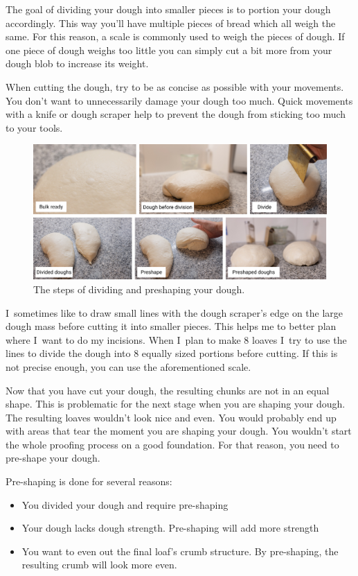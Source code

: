 The goal of dividing your dough into smaller pieces is to portion
your dough accordingly. This way you'll have multiple pieces of bread
which all weigh the same. For this reason, a scale is commonly
used to weigh the pieces of dough. If one piece of dough weighs
too little you can simply cut a bit more from your dough blob
to increase its weight.

When cutting the dough, try to be as concise as possible with your
movements. You don't want to unnecessarily damage your dough too much.
Quick movements with a knife or dough scraper help to prevent the
dough from sticking too much to your tools.

\begin{figure}[!htb]
  \includegraphics[width=\textwidth]{divide-preshape}
  \caption{The steps of dividing and preshaping your dough.}
\end{figure}

I~sometimes like to draw small lines with the dough scraper's edge
on the large dough mass before cutting it into smaller pieces.
This helps me to better plan where I~want to do my incisions. When
I~plan to make 8 loaves I~try to use the lines to divide the dough
into 8 equally sized portions before cutting. If this is not precise enough,
you can use the aforementioned scale.

Now that you have cut your dough, the resulting chunks are not in an equal shape.
This is problematic for the next stage when you are shaping your dough.
The resulting loaves wouldn't look nice and even. You would probably
end up with areas that tear the moment you are shaping your dough.
You wouldn't start the whole proofing process on a good foundation. For that
reason, you need to pre-shape your dough.

Pre-shaping is done for several reasons:
\begin{itemize}
  \item You divided your dough and require pre-shaping
  \item Your dough lacks dough strength. Pre-shaping will add more strength
  \item You want to even out the final loaf's crumb structure. By pre-shaping,
  the resulting crumb will look more even.
\end{itemize}

